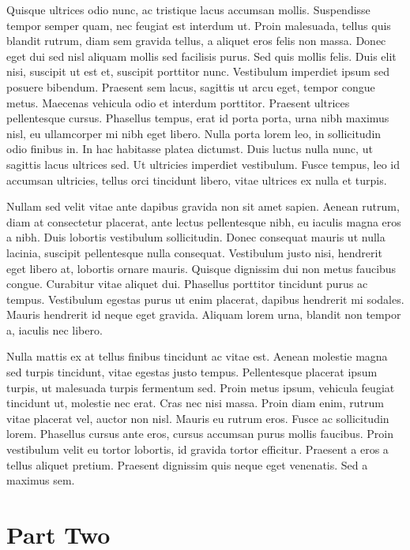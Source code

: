 Quisque ultrices odio nunc, ac tristique lacus accumsan mollis. Suspendisse tempor semper quam, nec feugiat est interdum ut. Proin malesuada, tellus quis blandit rutrum, diam sem gravida tellus, a aliquet eros felis non massa. Donec eget dui sed nisl aliquam mollis sed facilisis purus. Sed quis mollis felis. Duis elit nisi, suscipit ut est et, suscipit porttitor nunc. Vestibulum imperdiet ipsum sed posuere bibendum. Praesent sem lacus, sagittis ut arcu eget, tempor congue metus. Maecenas vehicula odio et interdum porttitor. Praesent ultrices pellentesque cursus. Phasellus tempus, erat id porta porta, urna nibh maximus nisl, eu ullamcorper mi nibh eget libero. Nulla porta lorem leo, in sollicitudin odio finibus in. In hac habitasse platea dictumst. Duis luctus nulla nunc, ut sagittis lacus ultrices sed. Ut ultricies imperdiet vestibulum. Fusce tempus, leo id accumsan ultricies, tellus orci tincidunt libero, vitae ultrices ex nulla et turpis.

Nullam sed velit vitae ante dapibus gravida non sit amet sapien. Aenean rutrum, diam at consectetur placerat, ante lectus pellentesque nibh, eu iaculis magna eros a nibh. Duis lobortis vestibulum sollicitudin. Donec consequat mauris ut nulla lacinia, suscipit pellentesque nulla consequat. Vestibulum justo nisi, hendrerit eget libero at, lobortis ornare mauris. Quisque dignissim dui non metus faucibus congue. Curabitur vitae aliquet dui. Phasellus porttitor tincidunt purus ac tempus. Vestibulum egestas purus ut enim placerat, dapibus hendrerit mi sodales. Mauris hendrerit id neque eget gravida. Aliquam lorem urna, blandit non tempor a, iaculis nec libero.

Nulla mattis ex at tellus finibus tincidunt ac vitae est. Aenean molestie magna sed turpis tincidunt, vitae egestas justo tempus. Pellentesque placerat ipsum turpis, ut malesuada turpis fermentum sed. Proin metus ipsum, vehicula feugiat tincidunt ut, molestie nec erat. Cras nec nisi massa. Proin diam enim, rutrum vitae placerat vel, auctor non nisl. Mauris eu rutrum eros. Fusce ac sollicitudin lorem. Phasellus cursus ante eros, cursus accumsan purus mollis faucibus. Proin vestibulum velit eu tortor lobortis, id gravida tortor efficitur. Praesent a eros a tellus aliquet pretium. Praesent dignissim quis neque eget venenatis. Sed a maximus sem.

\part{Part Two}


